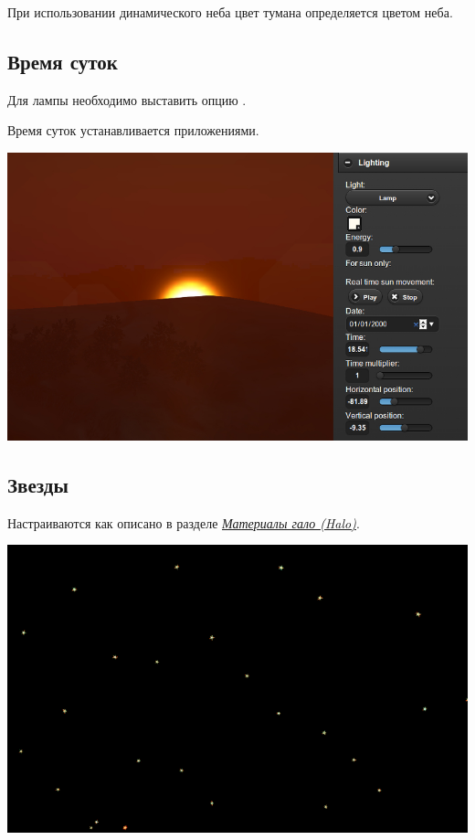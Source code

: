 \documentclass[a4paper,12pt,oneside]{sphinxmanual}
\begin{document}
При использовании динамического неба цвет тумана определяется цветом неба.


\subsection{Время суток}
\label{outdoor_rendering:id28}
Для лампы необходимо выставить опцию .

Время суток устанавливается приложениями.

{\hfill\includegraphics[width=1.000\linewidth]{sunset.jpg}\hfill}


\subsection{Звезды}
\label{outdoor_rendering:id29}
Настраиваются как описано в разделе {\hyperref[materials:material-halo]{\emph{Материалы гало (Halo)}}}.

{\hfill\includegraphics[width=1.000\linewidth]{stars.jpg}\hfill}
\end{document}
